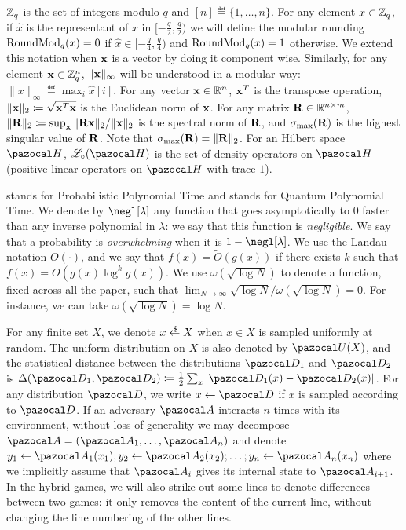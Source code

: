  $\mathbb{Z}_q$ is the set of integers modulo $q$ and $[n] \eqdef \{1,\dots,n\}$. For any element $x \in \mathbb{Z}_q$, if $\hat{x}$ is the representant of $x$ in $[-\frac{q}{2}, \frac{q}{2})$ we will define the modular rounding $\operatorname{RoundMod}_q(x) = 0$ if $\hat{x} \in [-\frac{q}{4}, \frac{q}{4})$ and $\operatorname{RoundMod}_q(x) = 1$ otherwise. We extend this notation when $\mathbf{x}$ is a vector by doing it component wise. Similarly, for any element $\mathbf{x} \in \mathbb{Z}_q^n$, $\|\mathbf{x}\|_\infty$ will be understood in a modular way: $\|x\|_\infty \eqdef \max_i \hat{x}[i]$. For any vector $\mathbf{x} \in \mathbb{R}^n$, $\mathbf{x}^T$ is the transpose operation, $\|\mathbf{x}\|_2 \coloneqq \sqrt{\mathbf{x}^T \mathbf{x}}$ is the Euclidean norm of $\mathbf{x}$. For any matrix $\mathbf{R} \in \mathbb{R}^{n\times m}$, $\|\mathbf{R}\|_2 \coloneqq \sup_{\mathbf{x}} \|\mathbf{R}\mathbf{x}\|_2/\|\mathbf{x}\|_2$ is the spectral norm of $\mathbf{R}$, and $\sigma_{\max}(\mathbf{R})$ is the highest singular value of $\mathbf{R}$. Note that $\sigma_{\max}(\mathbf{R}) = \|\mathbf{R}\|_2$. For an Hilbert space $\cH$, $\linearOp_\circ(\cH)$ is the set of density operators on $\cH$ (positive linear operators on $\cH$ with trace $1$).

\PPT{} stands for Probabilistic Polynomial Time and \QPT{} stands for Quantum Polynomial Time. We denote by $\negl[\lambda]$ any function that goes asymptotically to $0$ faster than any inverse polynomial in $\lambda$: we say that this function is \emph{negligible}. We say that a probability is \emph{overwhelming} when it is $1-\negl[\lambda]$. We use the Landau notation $O(\cdot)$, and we say that $f(x) = \tilde{O}(g(x))$ if there exists $k$ such that $f(x) = O(g(x) \log^k g(x))$. We use $\omega(\sqrt{\log N})$ to denote a function, fixed across all the paper, such that $\lim_{N \rightarrow \infty} \sqrt{\log N}/\omega(\sqrt{\log N}) = 0$. For instance, we can take $\omega(\sqrt{\log N}) = \log N$.

For any finite set $X$, we denote $x \sample X$ when $x \in X$ is sampled uniformly at random. The uniform distribution on $X$ is also denoted by $\cU(X)$, and the statistical distance between the distributions $\cD_1$ and $\cD_2$ is $\Delta(\cD_1,\cD_2) \eqdef \frac{1}{2} \sum_{x}|\cD_1(x)-\cD_2(x)|$. For any distribution $\cD$, we write $x \gets \cD$ if $x$ is sampled according to $\cD$. If an adversary $\cA$ interacts $n$ times with its environment, without loss of generality we may decompose $\cA = (\cA_1, \dots, \cA_n)$ and denote $y_1 \leftarrow \cA_1(x_1); y_2 \leftarrow \cA_2(x_2); \dots; y_n \leftarrow \cA_n(x_n)$ where we implicitly assume that $\cA_{i}$ gives its internal state to $\cA_{i+1}$. In the hybrid games, we will also strike out some lines to denote differences between two games: it only removes the content of the current line, without changing the line numbering of the other lines.

